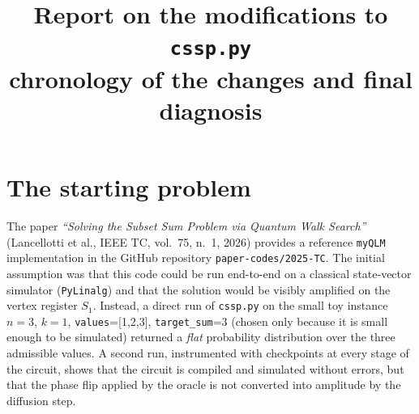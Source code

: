 \documentclass[11pt,a4paper]{article}
\title{\textbf{Report on the modifications to \texttt{cssp.py}}\\[0.3em]
\large
chronology of the changes and final diagnosis}
\begin{document}
\maketitle

\section{The starting problem}

The paper \emph{``Solving the Subset Sum Problem via Quantum Walk
Search''} (Lancellotti et al., IEEE TC, vol.~75, n.~1, 2026) provides a
reference \texttt{myQLM} implementation in the GitHub repository
\texttt{paper-codes/2025-TC}. The initial assumption was that this
code could be run end-to-end on a classical state-vector simulator
(\texttt{PyLinalg}) and that the solution would be visibly amplified on
the vertex register $S_1$. Instead, a direct run of \texttt{cssp.py} on
the small toy instance $n{=}3$, $k{=}1$, \texttt{values}=[1,2,3],
\texttt{target\_sum}=3 (chosen only because it is small enough to be
simulated) returned a \emph{flat} probability distribution
over the three admissible values. A second run, instrumented with
checkpoints at every stage of the circuit, shows that the circuit is
compiled and simulated without errors, but that the phase flip applied
by the oracle is not converted into amplitude by the diffusion step.
\end{document}
